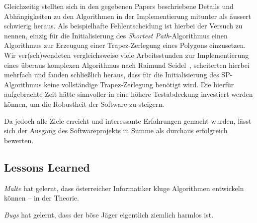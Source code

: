   Gleichzeitig stellten sich in den gegebenen Papers beschriebene Details und
  Abhängigkeiten zu den Algorithmen in der Implementierung mitunter als äussert
  schwierig heraus. Als beispielhafte Fehlentscheidung ist hierbei der Versuch
  zu nennen, einzig für die Initialisierung des \emph{Shortest Path}-Algorithmus
  einen Algorithmus zur Erzeugung einer Trapez-Zerlegung eines Polygons einzusetzen.
  Wir ver(sch)wendeten vergleichsweise viele Arbeitsstunden zur
  Implementierung eines überaus komplexen Algorithmus nach Raimund
  Seidel~\cite{seidel91asimple}, scheiterten hierbei mehrfach und fanden
  schließlich heraus, dass für die Initialisierung des SP-Algorithmus keine
  vollständige Trapez-Zerlegung benötigt wird. Die hierfür aufgebrachte Zeit hätte
  sinnvoller in eine höhere Testabdeckung investiert werden können, um die
  Robustheit der Software zu steigern.

  Da jedoch alle Ziele erreicht und interessante Erfahrungen gemacht wurden, lässt
  sich der Ausgang des Softwareprojekts in Summe als durchaus erfolgreich bewerten.

  \subsection{Lessons Learned}

  \begin{lessonlearned}
    \emph{Malte} hat gelernt, dass österreicher Informatiker kluge 
    Algorithmen entwickeln können -- in der Theorie.
  \end{lessonlearned}

  \begin{lessonlearned}
    \emph{Bugs} hat gelernt, dass der böse Jäger eigentlich 
    ziemlich harmlos ist.
  \end{lessonlearned}
